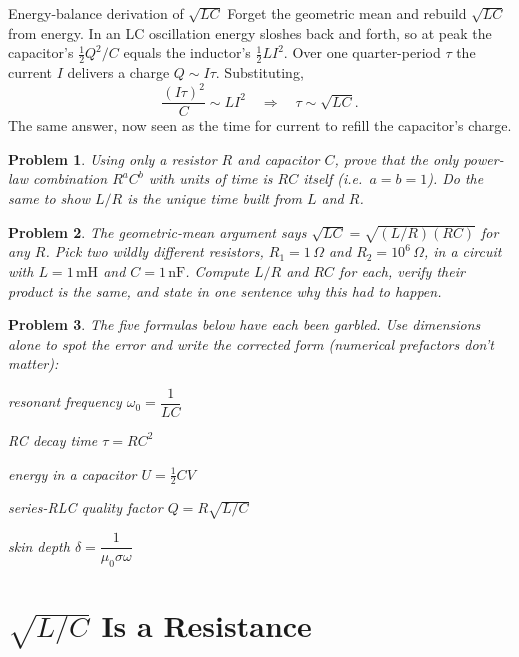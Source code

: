 \documentclass[11pt]{article}
\newcommand{\clearpts}{\addtocounter{tpts}{\value{cpts}} \setcounter{cpts}{0}}
\newcommand{\pts}[1]{\clearpts \setcounter{cpts}{#1}}
\theoremstyle{mystyle}
\newtheorem{pproblem}{Problem}
\begin{document}
\begin{psexample}{Energy-balance derivation of $\sqrt{LC}$}{}
Forget the geometric mean and rebuild $\sqrt{LC}$ from energy. In an LC oscillation
energy sloshes back and forth, so at peak the capacitor's $\tfrac12 Q^2/C$ equals the
inductor's $\tfrac12 LI^2$. Over one quarter-period $\tau$ the current $I$ delivers a
charge $Q\sim I\tau$. Substituting,
\[
\frac{(I\tau)^2}{C}\sim L I^2
\quad\Longrightarrow\quad
\tau \sim \sqrt{LC}.
\]
The same answer, now seen as the time for current to refill the capacitor's charge.
\end{psexample}

\pts{3}
\begin{pproblem}
Using only a resistor $R$ and capacitor $C$, prove that the \emph{only} power-law
combination $R^aC^b$ with units of time is $RC$ itself (i.e.\ $a=b=1$). Do the same
to show $L/R$ is the unique time built from $L$ and $R$.
\end{pproblem}

\pts{4}
\begin{pproblem}
The geometric-mean argument says $\sqrt{LC}=\sqrt{(L/R)(RC)}$ for \emph{any} $R$.
Pick two wildly different resistors, $R_1=1\,\Omega$ and $R_2=10^6\,\Omega$, in a
circuit with $L=1\,\text{mH}$ and $C=1\,\text{nF}$. Compute $L/R$ and $RC$ for each,
verify their product is the same, and state in one sentence why this had to happen.
\end{pproblem}

\pts{4}
\begin{pproblem} 
The five formulas below have each been garbled. Use dimensions alone to spot the
error and write the corrected form (numerical prefactors don't matter):
\begin{subpart}
\item resonant frequency $\omega_0 = \dfrac{1}{LC}$
\item RC decay time $\tau = RC^2$
\item energy in a capacitor $U = \tfrac12 CV$
\item series-RLC quality factor $Q = R\sqrt{L/C}$
\item skin depth $\delta = \dfrac{1}{\mu_0\sigma\omega}$
\end{subpart}
\end{pproblem}

\section{$\sqrt{L/C}$ Is a Resistance}
\end{document}
